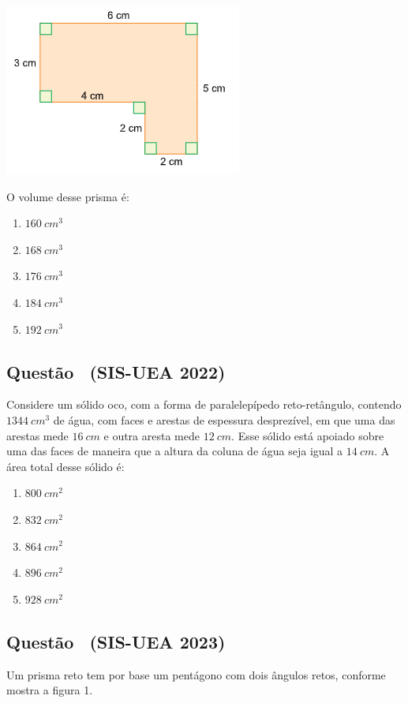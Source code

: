 \documentclass[12pt]{article}
\newcounter{questao}
\newcommand{\novaquestao}[1]{%
  \stepcounter{questao}%
  \subsection*{Questão \thequestao\ (#1)}%
}
\begin{document}
\begin{multicols}{2}
            \begin{center}
                \includegraphics[scale=0.6]{imagem/q7.png}
            \end{center} O volume desse prisma é:
        
            \begin{enumerate}[label=(\Alph*), noitemsep]
                \item $160 \ cm^{3}$
                \item $168 \ cm^{3}$
                \item {$176 \ cm^{3}$} %
                \item $184 \ cm^{3}$
                \item $192 \ cm^{3}$
            \end{enumerate}

        \novaquestao{SIS-UEA 2022}
            Considere um sólido oco, com a forma de paralelepípedo reto-retângulo, contendo $1 344\  cm^{3}$ de água, com faces e arestas de espessura desprezível, em que uma das arestas mede $16\ cm$ e outra aresta mede $12\ cm$. Esse sólido está apoiado sobre uma das faces de maneira que a altura da coluna de água seja igual a $14\ cm$. A área total desse sólido é:
        
            \begin{enumerate}[label=(\alph*), noitemsep]
                \item $800\ cm^{2}$
                \item {$832\ cm^{2}$} %
                \item $864\ cm^{2}$
                \item $896\ cm^{2}$
                \item $928\ cm^{2}$
            \end{enumerate}

        \novaquestao{SIS-UEA 2023}
            Um prisma reto tem por base um pentágono com dois ângulos retos, conforme mostra a figura 1.


\end{multicols}
\end{document}
